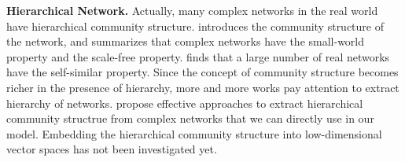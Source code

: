 \documentclass{article}
\theoremstyle{definition}
\begin{document}

	\textbf{Hierarchical Network.} Actually, many complex networks in the real world have hierarchical community structure. 
	\cite{newman2003structure} introduces the community structure of the network, and summarizes that complex networks have the small-world property and the scale-free property. \cite{song2005self} finds that a large number of real networks have the self-similar property. 
	Since the concept of community structure becomes richer in the presence of hierarchy, more and more works pay attention to extract hierarchy of networks.
	\cite{clauset2008hierarchical}
	\cite{Yang2013Hierarchical}\cite{sales-pardo2007extracting}\cite{Lancichinetti2008Detecting} propose effective approaches to extract hierarchical community structrue from complex networks that we can directly use in our model.
	Embedding the hierarchical community structure into low-dimensional vector spaces has not been investigated yet.
\end{document}
